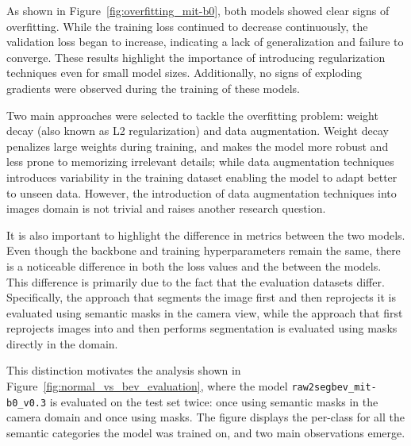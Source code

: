As shown in Figure~\ref{fig:overfitting_mit-b0}, both models showed clear signs of overfitting. While the training loss continued to decrease continuously, the validation loss began to increase, indicating a lack of generalization and failure to converge. These results highlight the importance of introducing regularization techniques even for small model sizes. Additionally, no signs of exploding gradients were observed during the training of these models. 

Two main approaches were selected to tackle the overfitting problem: weight decay (also known as L2 regularization) and data augmentation. Weight decay penalizes large weights during training, and makes the model more robust and less prone to memorizing irrelevant details; while data augmentation techniques introduces variability in the training dataset enabling the model to adapt better to unseen data. However, the introduction of data augmentation techniques into  images domain is not trivial and raises another research question.

It is also important to highlight the difference in metrics between the two models. Even though the backbone and training hyperparameters remain the same, there is a noticeable difference in both the loss values and the  between the models. This difference is primarily due to the fact that the evaluation datasets differ. Specifically, the approach that segments the image first and then reprojects it is evaluated using semantic masks in the camera view, while the approach that first reprojects images into  and then performs segmentation is evaluated using masks directly in the  domain.

This distinction motivates the analysis shown in Figure~\ref{fig:normal_vs_bev_evaluation}, where the model \texttt{raw2segbev\_mit-b0\_v0.3} is evaluated on the test set twice: once using semantic masks in the camera domain and once using  masks. The figure displays the per-class  for all the semantic categories the model was trained on, and two main observations emerge.


